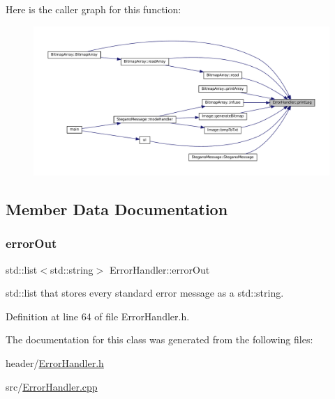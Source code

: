 Here is the caller graph for this function\+:
\nopagebreak
\begin{figure}[H]
\begin{center}
\leavevmode
\includegraphics[width=350pt]{classErrorHandler_adefe2e5f3401006300884dd85a7c88ce_icgraph}
\end{center}
\end{figure}


\subsection{Member Data Documentation}
\mbox{\label{classErrorHandler_aeb3bff116fcb83a58defbef8e8111f0e}} 
\subsubsection{\texorpdfstring{errorOut}{errorOut}}
{\footnotesize\ttfamily std\+::list$<$std\+::string$>$ Error\+Handler\+::error\+Out\hspace{0.3cm}{\ttfamily [private]}}

std\+::list that stores every standard error message as a std\+::string. 

Definition at line 64 of file Error\+Handler.\+h.



The documentation for this class was generated from the following files\+:\begin{DoxyCompactItemize}
\item 
header/\mbox{\hyperlink{ErrorHandler_8h}{Error\+Handler.\+h}}\item 
src/\mbox{\hyperlink{ErrorHandler_8cpp}{Error\+Handler.\+cpp}}\end{DoxyCompactItemize}
